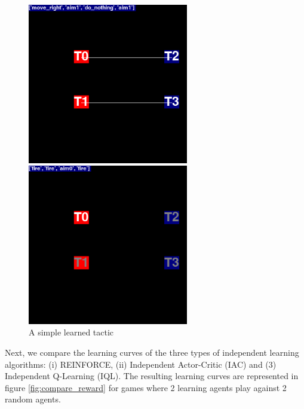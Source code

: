 \begin{figure}
\begin{minipage}{.5\textwidth}
  \includegraphics[width=7cm]{images/animation01/screenshot0-3.png}
\end{minipage}%
\begin{minipage}{.5\textwidth}
  \centering
  \includegraphics[width=7cm]{images/animation01/screenshot0-4.png}
\end{minipage}
\caption{A simple learned tactic}
\label{fig:simple_tactic01}
\end{figure}

Next, we compare the learning curves of the three types of independent learning algorithms: (i) REINFORCE, (ii) Independent Actor-Critic (IAC) and (3) Independent Q-Learning (IQL). The resulting learning curves are represented in figure \ref{fig:compare_reward} for games where 2 learning agents play against 2 random agents.

